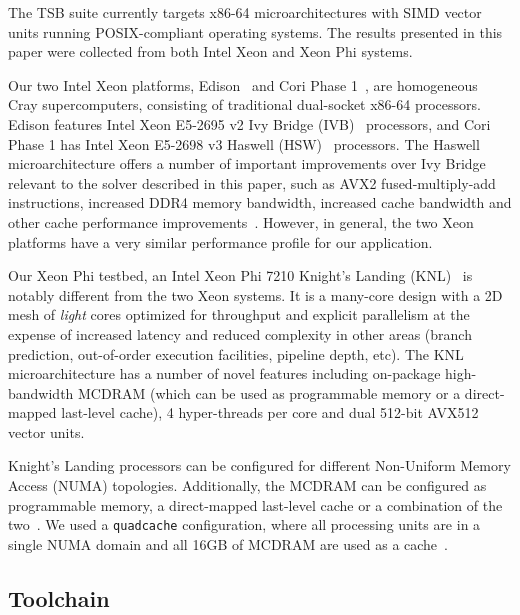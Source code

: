 \documentclass{sig-alternate-05-2015}
\begin{document}
The TSB suite currently targets x86-64 microarchitectures with SIMD vector units
  running POSIX-compliant operating systems.
The results presented in this paper were collected from both Intel Xeon and
  Xeon Phi systems.

Our two Intel Xeon platforms, Edison~\cite{edison_configuration} and Cori Phase
  1~\cite{cori_phase_1_configuration}, are homogeneous Cray supercomputers,
  consisting of traditional dual-socket x86-64 processors.
Edison features Intel Xeon E5-2695 v2 Ivy Bridge (IVB)~\cite{intel_ark_xeon_e5_2695_v2}
  processors, and Cori Phase 1 has Intel Xeon E5-2698
  v3 Haswell (HSW)~\cite{intel_ark_xeon_e5_2698_v3} processors.
The Haswell microarchitecture offers a number of important improvements over
  Ivy Bridge relevant to the solver described in this paper, such as AVX2
  fused-multiply-add instructions, increased DDR4 memory bandwidth, increased
  cache bandwidth and other cache performance improvements~\cite{intel_opt_manual}.
However, in general, the two Xeon platforms have a very similar performance
  profile for our application.

Our Xeon Phi testbed, an Intel Xeon Phi 7210 Knight's Landing (KNL)~\cite{intel_ark_xeon_phi_7210}
  is notably different from the two Xeon systems.
It is a many-core design with a 2D mesh of \emph{light} cores optimized
  for throughput and explicit parallelism at the expense of increased latency
  and reduced complexity in other areas (branch prediction, out-of-order
  execution facilities, pipeline depth, etc).
The KNL microarchitecture has a number of novel features including on-package
  high-bandwidth MCDRAM (which can be used as programmable memory or a
  direct-mapped last-level cache), 4 hyper-threads per core and dual 512-bit
  AVX512 vector units.~\cite{roofline_knl,sodani_slides}

Knight's Landing processors can be configured for different Non-Uniform Memory
  Access (NUMA) topologies.
Additionally, the MCDRAM can be configured as programmable memory, a direct-mapped
  last-level cache or a combination of the two~\cite{sodani_slides}.
We used a \lstinline{quadcache} configuration, where all processing units are
  in a single NUMA domain and all 16GB of MCDRAM are used as a
  cache~\cite{roofline_knl}.

\subsection{Toolchain}
\label{sec:experimental_setup:toolchain}
\end{document}
